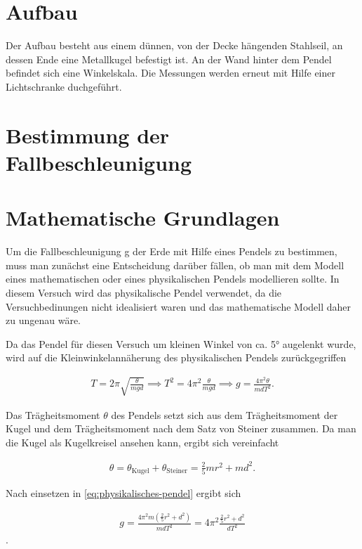 \section{Aufbau}

Der Aufbau besteht aus einem dünnen, von der Decke hängenden Stahlseil, an dessen Ende eine Metallkugel befestigt ist. An der Wand hinter dem Pendel befindet sich eine Winkelskala. Die Messungen werden erneut mit Hilfe einer Lichtschranke duchgeführt.

\section{Bestimmung der Fallbeschleunigung}

\section{Mathematische Grundlagen}

Um die Fallbeschleunigung g der Erde mit Hilfe eines Pendels zu bestimmen, muss man zunächst eine Entscheidung darüber fällen, ob man mit dem Modell eines mathematischen oder eines physikalischen Pendels modellieren sollte.
In diesem Versuch wird das physikalische Pendel verwendet, da die Versuchbedinungen nicht idealisiert waren und das mathematische Modell daher zu ungenau wäre.

Da das Pendel für diesen Versuch um kleinen Winkel von ca. 5° augelenkt wurde, wird auf die Kleinwinkelannäherung des physikalischen Pendels zurückgegriffen

\begin{align}
	\label{eq:physikalisches-pendel}
	T = 2 \pi \sqrt{\frac{\theta}{m g d}}  \implies T^2 = 4 \pi^2 \frac{\theta}{m g d} \implies g = \frac{4 \pi^2 \theta}{m d T^2} .
\end{align}

Das Trägheitsmoment $\theta$ des Pendels setzt sich aus dem Trägheitsmoment der Kugel und dem Trägheitsmoment nach dem Satz von Steiner zusammen.
Da man die Kugel als Kugelkreisel ansehen kann, ergibt sich vereinfacht

\begin{align}
	\theta = \theta_\text{Kugel} + \theta_\text{Steiner} = \frac{2}{5} m r^2 + m d^2 .
\end{align}

Nach einsetzen in \ref{eq:physikalisches-pendel} ergibt sich

\begin{align}
	\label{eq:ortsfaktor}
	g = \frac{4 \pi^2 m (\frac{2}{5} r^2 + d^2)}{m d T^2} = 4 \pi^2 \frac{\frac{2}{5} r^2 + d^2}{d T^2}
\end{align} .

